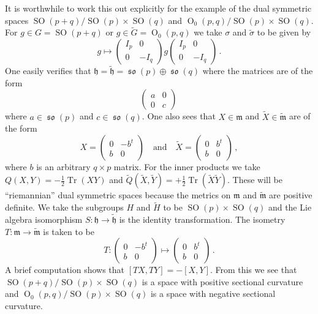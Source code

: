\documentclass[a4paper,12pt]{article}
\DeclareMathOperator{\so}{\mathfrak{s}\mathfrak{o}}
\DeclareMathOperator{\Tr}{Tr}
\DeclareMathOperator{\Orth}{O}
\DeclareMathOperator{\SOrth}{SO}
\newcommand{\lieh}{\mathfrak{h}}
\newcommand{\liem}{\mathfrak{m}}
\newcommand{\Gtil}{\widetilde{G}}
\newcommand{\Htil}{\widetilde{H}}
\newcommand{\Qtil}{\widetilde{Q}}
\newcommand{\half}{\frac{1}{2}}
\newcommand{\sigtil}{\tilde{\sigma}}
\begin{document}
It is worthwhile to work this out explicitly for the example of the dual
symmetric spaces $\SOrth(p+q)/\SOrth(p)\times\SOrth(q)$ and
$\Orth_{0}(p,q)/\SOrth(p)\times\SOrth(q)$.  For $g\in G=\SOrth(p+q)$
or $g\in \Gtil=\Orth_{0}(p,q)$ we take $\sigma$ and
$\sigtil$ to be given by
$$
    g \mapsto
    \left(
    \begin{array}{cc}
        I_{p} & 0  \\
        0 & -I_{q}
    \end{array}
    \right) g
    \left(
    \begin{array}{cc}
        I_{p} & 0  \\
        0 & -I_{q}
    \end{array}
    \right)\,.
$$
One easily verifies that $\lieh=\tilde{\lieh} = \so(p) \oplus \so(q)$ 
where the matrices are of the form
$$
    \left(
    \begin{array}{cc}
        a & 0  \\
        0 & c
    \end{array}
    \right) \,
$$
where $a \in \so(p)$ and $c\in \so(q)$. One also sees that 
$X\in\liem$ and $\widetilde{X}\in \widetilde{\liem}$ are of the form
$$
    X = \left(
    \begin{array}{cc}
        0 & -b^{t}  \\
        b & 0
    \end{array}
    \right)
    \quad\mbox{and}\quad
    \widetilde{X} = \left(
    \begin{array}{cc}
        0 & b^{t}  \\
        b & 0
    \end{array}
    \right)\,,
$$
where $b$ is an arbitrary $q\times p$ matrix.  For the inner products
we take $Q(X,Y) = -\half\Tr(XY)$ and
$\Qtil(\widetilde{X},\widetilde{Y}) =
+\half\Tr(\widetilde{X}\widetilde{Y})$.  These will be ``riemannian''
dual symmetric spaces because the metrics on $\liem$ and
$\widetilde{\liem}$ are positive definite.  We take the subgroups $H$
and $\Htil$ to be $\SOrth(p)\times\SOrth(q)$ and the Lie algebra
isomorphism $S:\lieh \to \tilde{\lieh}$ is the identity
transformation.  The isometry $T:\liem\to \widetilde{\liem}$ is taken
to be
$$
    T:
    \left(
    \begin{array}{cc}
        0 & -b^{t}  \\
        b & 0
    \end{array}
    \right)
    \mapsto
    \left(
    \begin{array}{cc}
        0 & b^{t}  \\
        b & 0
    \end{array}
    \right)\,.
$$    
A brief computation shows that $[TX,TY] = -[X,Y]$.  From this we see
that $\SOrth(p+q)/\SOrth(p)\times\SOrth(q)$ is a space with positive
sectional curvature and $\Orth_{0}(p,q)/\SOrth(p)\times\SOrth(q)$ is a
space with negative sectional curvature.
\end{document}
